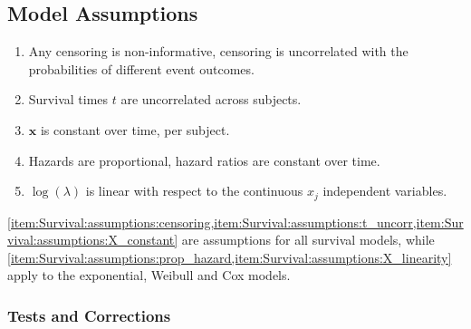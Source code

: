 \subsection{Model Assumptions}
\label{additional:Survival:assumptions}

\begin{enumerate}[noitemsep]
  \item Any censoring is non-informative, \ie censoring is uncorrelated with the probabilities of different event outcomes.\label{item:Survival:assumptions:censoring}
  \item Survival times $t$ are uncorrelated across subjects.\label{item:Survival:assumptions:t_uncorr}
  \item $\mathbf{x}$ is constant over time, per subject.\label{item:Survival:assumptions:X_constant}
  \item Hazards are proportional, \ie hazard ratios are constant over time.\label{item:Survival:assumptions:prop_hazard}
  \item $\log\left(\lambda\right)$ is linear with respect to the continuous $x_{j}$ independent variables.\label{item:Survival:assumptions:X_linearity}
\end{enumerate}

\cref{item:Survival:assumptions:censoring,item:Survival:assumptions:t_uncorr,item:Survival:assumptions:X_constant}
are assumptions for all survival models, while
\cref{item:Survival:assumptions:prop_hazard,item:Survival:assumptions:X_linearity}
apply to the exponential, Weibull and Cox models.

\subsubsection{Tests and Corrections}
\label{additional:Survival:assumptions:tests_and_corrections}

